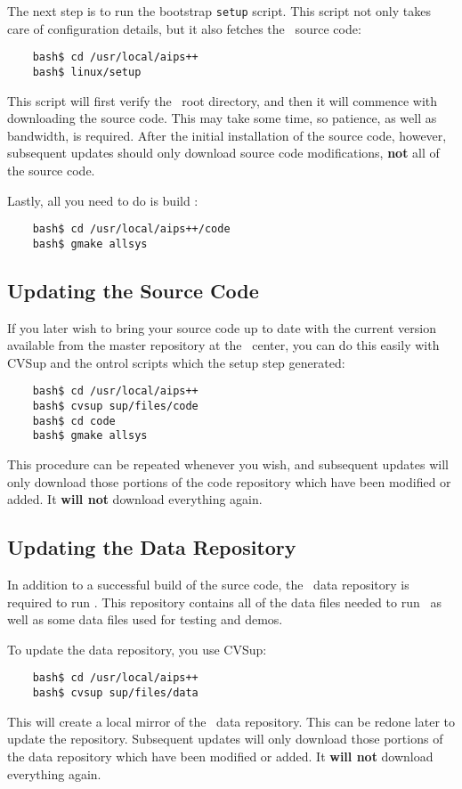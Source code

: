 The next step is to run the bootstrap \verb+setup+ script. This script not only
takes care of configuration details, but it also fetches the \aipspp\ source code:
\begin{verbatim}
    bash$ cd /usr/local/aips++
    bash$ linux/setup
\end{verbatim}
This script will first verify the \aipspp\ root directory, and then it will
commence with downloading the source code. This may take some time, so
patience, as well as bandwidth, is required. After the initial installation
of the source code, however, subsequent updates should only download source
code modifications, {\bf not} all of the source code.

Lastly, all you need to do is build \aipspp:
\begin{verbatim}
    bash$ cd /usr/local/aips++/code
    bash$ gmake allsys
\end{verbatim}


\subsection{Updating the Source Code}
\label{developer release source code}

If you later wish to bring your source code up to date with the current version
available from the master repository at the \aipspp\ center, you can do this
easily with CVSup and the ontrol scripts which the setup step generated:
\begin{verbatim}
    bash$ cd /usr/local/aips++
    bash$ cvsup sup/files/code
    bash$ cd code
    bash$ gmake allsys
\end{verbatim}
This procedure can be repeated whenever you wish, and subsequent updates will
only download those portions of the code repository which have been modified
or added. It {\bf will not} download everything again.

\subsection{Updating the Data Repository}
\label{developer release data repository}

In addition to a successful build of the surce code, the \aipspp\ data repository
is required to run \aipspp. This repository contains all of the data files needed
to run \aipspp\ as well as some data files used for testing and demos.

To update the data repository, you use CVSup:
\begin{verbatim}
    bash$ cd /usr/local/aips++
    bash$ cvsup sup/files/data
\end{verbatim}
This will create a local mirror of the \aipspp\ data repository. This can be
redone later to update the repository. Subsequent updates will only download
those portions of the data repository which have been modified or added. It
{\bf will not} download everything again.

